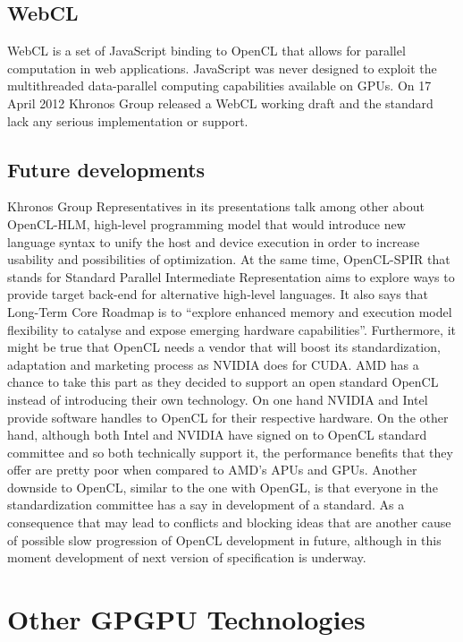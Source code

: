 \subsection{WebCL}
WebCL is a set of JavaScript binding to OpenCL that allows for parallel computation in web applications. JavaScript was never designed to exploit the multithreaded data-parallel computing capabilities available on GPUs. On 17 April 2012 Khronos Group released a WebCL working draft and the standard lack any serious implementation or support.\cite{khronos2012webcl}

\subsection{Future developments}
Khronos Group Representatives in its presentations talk among other about OpenCL-HLM, high-level programming model that would introduce new language syntax to unify the host and device execution in order to increase usability and possibilities of optimization. At the same time, OpenCL-SPIR that stands for Standard Parallel Intermediate Representation aims to explore ways to provide target back-end for alternative high-level languages. It also says that Long-Term Core Roadmap is to \enquote{explore enhanced memory and execution model flexibility to catalyse and expose emerging hardware capabilities}.\cite{khronos2012cloverview} Furthermore, it might be true that OpenCL needs a vendor that will boost its standardization, adaptation and marketing process as NVIDIA does for CUDA. AMD has a chance to take this part as they decided to support an open standard OpenCL instead of introducing their own technology. On one hand NVIDIA and Intel provide software handles to OpenCL for their respective hardware. On the other hand, although both Intel and NVIDIA have signed on to OpenCL standard committee and so both technically support it, the performance benefits that they offer are pretty poor when compared to AMD's APUs and GPUs. Another downside to OpenCL, similar to the one with OpenGL, is that everyone in the standardization committee has a say in development of a standard. As a consequence that may lead to conflicts and blocking ideas that are another cause of possible slow progression of OpenCL development in future, although in this moment development of next version of specification is underway.\cite{amd2012hipeac}

\section{Other GPGPU Technologies}
